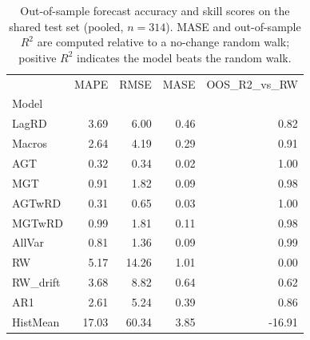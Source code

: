 \begin{table}
\centering
\caption{Out-of-sample forecast accuracy and skill scores on the shared test set (pooled, $n=314$). MASE and out-of-sample $R^2$ are computed relative to a no-change random walk; positive $R^2$ indicates the model beats the random walk.}
\label{tab:skill_scores}
\begin{tabular}{lrrrr}
\toprule
{} &  MAPE &  RMSE &  MASE &  OOS\_R2\_vs\_RW \\
Model    &       &       &       &               \\
\midrule
LagRD    &  3.69 &  6.00 &  0.46 &          0.82 \\
Macros   &  2.64 &  4.19 &  0.29 &          0.91 \\
AGT      &  0.32 &  0.34 &  0.02 &          1.00 \\
MGT      &  0.91 &  1.82 &  0.09 &          0.98 \\
AGTwRD   &  0.31 &  0.65 &  0.03 &          1.00 \\
MGTwRD   &  0.99 &  1.81 &  0.11 &          0.98 \\
AllVar   &  0.81 &  1.36 &  0.09 &          0.99 \\
RW       &  5.17 & 14.26 &  1.01 &          0.00 \\
RW\_drift &  3.68 &  8.82 &  0.64 &          0.62 \\
AR1      &  2.61 &  5.24 &  0.39 &          0.86 \\
HistMean & 17.03 & 60.34 &  3.85 &        -16.91 \\
\bottomrule
\end{tabular}
\end{table}
